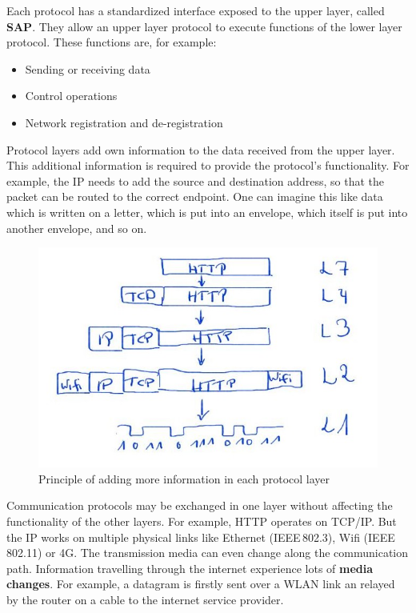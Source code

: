 \begin{refsection}
Each protocol has a standardized interface exposed to the upper layer, called  \textbf{\ac{SAP}}. They allow an upper layer protocol to execute functions of the lower layer protocol. These functions are, for example:
\begin{itemize}
	\item Sending or receiving data
	\item Control operations
	\item Network registration and de-registration
\end{itemize}

Protocol layers add own information to the data received from the upper layer. This additional information is required to provide the protocol's functionality. For example, the \acf{IP} needs to add the source and destination address, so that the packet can be routed to the correct endpoint. One can imagine this like data which is written on a letter, which is put into an envelope, which itself is put into another envelope, and so on.

\begin{figure}[H]
	\centering
	\includegraphics{../chapter01/Frame_Wrapping.jpg}
	\caption{Principle of adding more information in each protocol layer}
	\label{fig:ch01:frame_construction}
\end{figure}

Communication protocols may be exchanged in one layer without affecting the functionality of the other layers. For example, \ac{HTTP} operates on \acs{TCP}/\acs{IP}. But the \acf{IP} works on multiple physical links like Ethernet (IEEE\,802.3), Wifi (IEEE\,802.11) or 4G. The transmission media can even change along the communication path. Information travelling through the internet experience lots of  \textbf{media changes}. For example, a datagram is firstly sent over a \ac{WLAN} link an relayed by the router on a cable to the internet service provider.



\end{refsection}
